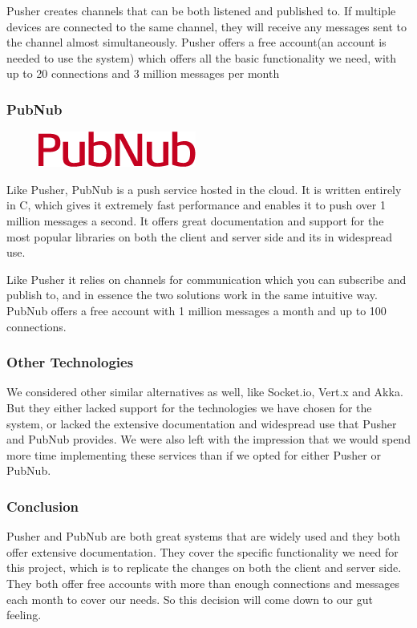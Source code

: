 Pusher creates channels that can be both listened and published to. If multiple devices are connected to the same channel, they will receive any messages sent to the channel almost simultaneously. Pusher offers a free account(an account is needed to use the system) which offers all the basic functionality we need, with up to 20 connections and 3 million messages per month

\subsubsection{PubNub}

\begin{figure}
\centering
\includegraphics[width=.19\textwidth]{image/pubnub-logo.png}
\end{figure}

Like Pusher, PubNub is a push service hosted in the cloud. It is written entirely in C, which gives it extremely fast performance and enables it to push over 1 million messages a second. It offers great documentation and support for the most popular libraries on both the client and server side and its in widespread use.

Like Pusher it relies on channels for communication which you can subscribe and publish to, and in essence the two solutions work in the same intuitive way. PubNub offers a free account with 1 million messages a month and up to 100 connections.

\subsubsection{Other Technologies}
We considered other similar alternatives as well, like Socket.io, Vert.x and Akka. But they either lacked support for the technologies we have chosen for the system, or lacked the extensive documentation and widespread use that Pusher and PubNub provides. We were also left with the impression that we would spend more time implementing these services than if we opted for either Pusher or PubNub.

\subsubsection{Conclusion}
Pusher and PubNub are both great systems that are widely used and they both offer extensive documentation. They cover the specific functionality we need for this project, which is to replicate the changes on both the client and server side. They both offer free accounts with more than enough connections and messages each month to cover our needs. So this decision will come down to our gut feeling. 

